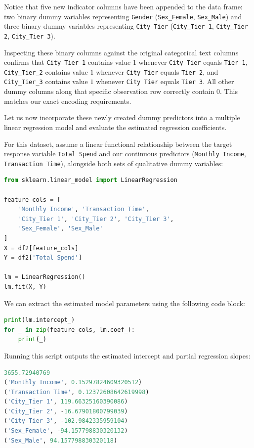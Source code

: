 Notice that five new indicator columns have been appended to the data frame: two binary dummy variables representing \texttt{Gender} (\texttt{Sex\_Female}, \texttt{Sex\_Male}) and three binary dummy variables representing \texttt{City Tier} (\texttt{City\_Tier 1}, \texttt{City\_Tier 2}, \texttt{City\_Tier 3}).

Inspecting these binary columns against the original categorical text columns confirms that \texttt{City\_Tier\_1} contains value $1$ whenever \texttt{City Tier} equals \texttt{Tier 1}, \texttt{City\_Tier\_2} contains value $1$ whenever \texttt{City Tier} equals \texttt{Tier 2}, and \texttt{City\_Tier\_3} contains value $1$ whenever \texttt{City Tier} equals \texttt{Tier 3}. All other dummy columns along that specific observation row correctly contain $0$. This matches our exact encoding requirements.

Let us now incorporate these newly created dummy predictors into a multiple linear regression model and evaluate the estimated regression coefficients.

For this dataset, assume a linear functional relationship between the target response variable \texttt{Total Spend} and our continuous predictors (\texttt{Monthly Income}, \texttt{Transaction Time}), alongside both sets of qualitative dummy variables:

\begin{lstlisting}[language=Python]
from sklearn.linear_model import LinearRegression

feature_cols = [
    'Monthly Income', 'Transaction Time',
    'City_Tier 1', 'City_Tier 2', 'City_Tier 3',
    'Sex_Female', 'Sex_Male'
]
X = df2[feature_cols]
Y = df2['Total Spend']

lm = LinearRegression()
lm.fit(X, Y)
\end{lstlisting}

We can extract the estimated model parameters using the following code block:
\begin{lstlisting}[language=Python]
print(lm.intercept_)
for _ in zip(feature_cols, lm.coef_):
    print(_)
\end{lstlisting}

Running this script outputs the estimated intercept and partial regression slopes:
\begin{lstlisting}[language=Python]
3655.72940769
('Monthly Income', 0.15297824609320512)
('Transaction Time', 0.12372608642619998)
('City_Tier 1', 119.66325160390086)
('City_Tier 2', -16.67901800799039)
('City_Tier 3', -102.9842335959104)
('Sex_Female', -94.157798830320132)
('Sex_Male', 94.157798830320118)
\end{lstlisting}

